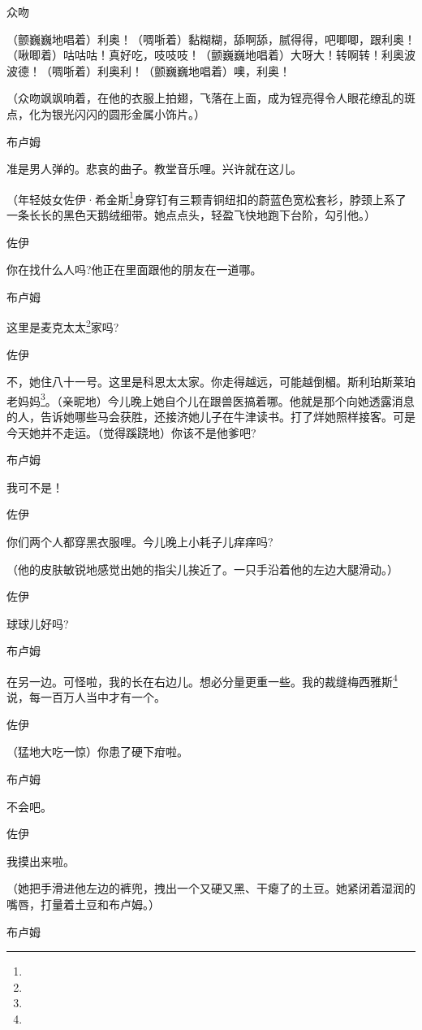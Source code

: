 \par 众吻
\par （颤巍巍地唱着）利奥！（啁哳着）黏糊糊，舔啊舔，腻得得，吧唧唧，跟利奥！（啾唧着）咕咕咕！真好吃，吱吱吱！（颤巍巍地唱着）大呀大！转啊转！利奥波波德！（啁哳着）利奥利！（颤巍巍地唱着）噢，利奥！
\par （众吻飒飒响着，在他的衣服上拍翅，飞落在上面，成为锃亮得令人眼花缭乱的斑点，化为银光闪闪的圆形金属小饰片。）
\par 布卢姆
\par 准是男人弹的。悲哀的曲子。教堂音乐哩。兴许就在这儿。
\par （年轻妓女佐伊·希金斯\footnote{}身穿钉有三颗青铜纽扣的蔚蓝色宽松套衫，脖颈上系了一条长长的黑色天鹅绒细带。她点点头，轻盈飞快地跑下台阶，勾引他。）
\par 佐伊
\par 你在找什么人吗?他正在里面跟他的朋友在一道哪。
\par 布卢姆
\par 这里是麦克太太\footnote{}家吗?
\par 佐伊
\par 不，她住八十一号。这里是科恩太太家。你走得越远，可能越倒楣。斯利珀斯莱珀老妈妈\footnote{}。（亲昵地）今儿晚上她自个儿在跟兽医搞着哪。他就是那个向她透露消息的人，告诉她哪些马会获胜，还接济她儿子在牛津读书。打了烊她照样接客。可是今天她并不走运。（觉得蹊跷地）你该不是他爹吧?
\par 布卢姆
\par 我可不是！
\par 佐伊
\par 你们两个人都穿黑衣服哩。今儿晚上小耗子儿痒痒吗?
\par （他的皮肤敏锐地感觉出她的指尖儿挨近了。一只手沿着他的左边大腿滑动。）
\par 佐伊
\par 球球儿好吗?
\par 布卢姆
\par 在另一边。可怪啦，我的长在右边儿。想必分量更重一些。我的裁缝梅西雅斯\footnote{}说，每一百万人当中才有一个。
\par 佐伊
\par （猛地大吃一惊）你患了硬下疳啦。
\par 布卢姆
\par 不会吧。
\par 佐伊
\par 我摸出来啦。
\par （她把手滑进他左边的裤兜，拽出一个又硬又黑、干瘪了的土豆。她紧闭着湿润的嘴唇，打量着土豆和布卢姆。）
\par 布卢姆
